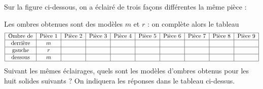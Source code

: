 Sur la figure ci-dessous, on a éclairé de trois façons différentes la
même pièce :
\par
{}
Les ombres obtenues sont des modèles $m$ et $r$ : on complète alors le
tableau
\[\begin{tabular}{|c|c|c|c|c|c|c|c|c|c|}
\hline
Ombre de&Pièce 1&Pièce 2&Pièce 3&Pièce 4&Pièce 5&Pièce 6&Pièce 7&Pièce 8&Pièce 9\\
\hline
derrière&$m$&&&&&&&&\\
\hline
gauche&$r$&&&&&&&&\\
\hline
dessous&$m$&&&&&&&&\\
\hline
\end{tabular}
\]
Suivant les mêmes éclairages, quels sont les modèles d'ombres obtenus
pour les huit solides suivants ? On indiquera les réponses dans le
tableau ci-dessus.
